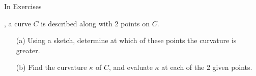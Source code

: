 {\noindent In Exercises}
{ , a curve $C$ is described along with 2 points on $C$. 
\begin{enumerate}
\item [(a)] Using a sketch, determine at which of these points the curvature is greater. 
\item [(b)] Find the curvature $\kappa$ of $C$, and evaluate $\kappa$ at each of the 2 given points.
\end{enumerate}
}

